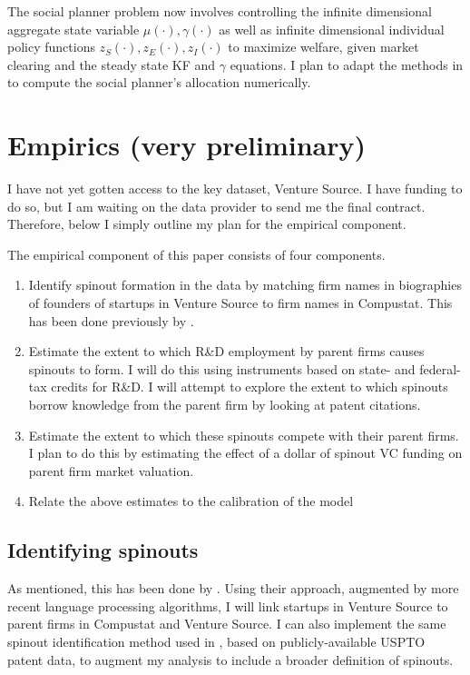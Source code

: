 \documentclass[12pt,english]{article}
\theoremstyle{remark}
\begin{document}
The social planner problem now involves controlling the infinite dimensional aggregate state variable $\mu(\cdot), \gamma(\cdot)$ as well as infinite dimensional individual policy functions $z_S(\cdot),z_E(\cdot),z_I(\cdot)$ to maximize welfare, given market clearing and the steady state KF and $\gamma$ equations. I plan to adapt the methods in \cite{nuno_social_2018} to compute the social planner's allocation numerically.

\section{Empirics (very preliminary)}\label{empirics}

I have not yet gotten access to the key dataset, Venture Source. I have funding to do so, but I am waiting on the data provider to send me the final contract. Therefore, below I simply outline my plan for the empirical component. 

The empirical component of this paper consists of four components. 

\begin{enumerate}
	\item Identify spinout formation in the data by matching firm names in biographies of founders of startups in Venture Source to firm names in Compustat. This has been done previously by \cite{gompers_entrepreneurial_2005}.
	\item Estimate the extent to which R\&D employment by parent firms causes spinouts to form. I will do this using instruments based on state- and federal-tax credits for R\&D. I will attempt to explore the extent to which spinouts borrow knowledge from the parent firm by looking at patent citations.
	\item Estimate the extent to which these spinouts compete with their parent firms. I plan to do this by estimating the effect of a dollar of spinout VC funding on parent firm market valuation.
	\item Relate the above estimates to the calibration of the model
\end{enumerate}

\subsection{Identifying spinouts}

As mentioned, this has been done by \cite{gompers_entrepreneurial_2005}. Using their approach, augmented by more recent language processing algorithms, I will link startups in Venture Source to parent firms in Compustat and Venture Source. I can also implement the same spinout identification method used in \cite{baslandze_spinout_2019}, based on publicly-available USPTO patent data, to augment my analysis to include a broader definition of spinouts.
\end{document}
